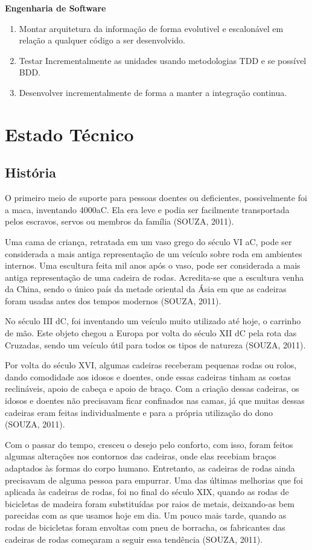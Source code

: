 \textbf{Engenharia de Software}
  \begin{enumerate}
    \item Montar arquitetura da informação de forma evolutivel e escalonável em relação a qualquer código a ser desenvolvido.
    \item Testar Incrementalmente as unidades usando metodologias TDD e se possível BDD.
    \item Desenvolver incrementalmente de forma a manter a integração continua.
  \end{enumerate}

\section{Estado Técnico}

\subsection{História}
O primeiro meio de suporte para pessoas doentes ou deficientes, possivelmente foi a maca, inventando 4000aC. Ela era leve e podia ser facilmente transportada pelos escravos, servos ou membros da família (SOUZA, 2011).

Uma cama de criança, retratada em um vaso grego do século VI aC, pode ser considerada a mais antiga representação de um veículo sobre roda em ambientes internos. Uma escultura feita mil anos após o vaso, pode ser considerada a mais antiga representação de uma cadeira de rodas. Acredita-se que a escultura venha da China, sendo o único país da metade oriental da Ásia em que as cadeiras foram usadas antes dos tempos modernos (SOUZA, 2011).

No século III dC, foi inventando um veículo muito utilizado até hoje, o carrinho de mão. Este objeto chegou a Europa por volta do século XII dC pela rota das Cruzadas, sendo um veículo útil para todos os tipos de natureza (SOUZA, 2011).

Por volta do século XVI, algumas cadeiras receberam pequenas rodas ou rolos, dando comodidade aos idosos e doentes, onde essas cadeiras tinham as costas reclináveis, apoio de cabeça e apoio de braço. Com a criação dessas cadeiras, os idosos e doentes não precisavam ficar confinados nas camas, já que muitas dessas cadeiras eram feitas individualmente e para a própria utilização do dono (SOUZA, 2011).

Com o passar do tempo, cresceu o desejo pelo conforto, com isso, foram feitos algumas alterações nos contornos das cadeiras, onde elas recebiam braços adaptados às formas do corpo humano. Entretanto, as cadeiras de rodas ainda precisavam de alguma pessoa para empurrar. Uma das últimas melhorias que foi aplicada às cadeiras de rodas, foi no final do século XIX, quando as rodas de bicicletas de madeira foram substituídas por raios de metais, deixando-as bem parecidas com as que usamos hoje em dia. Um pouco mais tarde, quando as rodas de bicicletas foram envoltas com pneu de borracha, os fabricantes das cadeiras de rodas começaram a seguir essa tendência (SOUZA, 2011).

